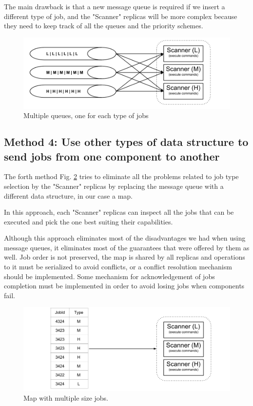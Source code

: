 The main drawback is that a new message queue is required if we insert a different type of job, and the "Scanner" replicas will be more complex because they need to keep track of all the queues and the priority schemes.

\begin{figure}[ht]
\centering
\includegraphics[width=\linewidth]{./img/3_MultipleQueueLoadBalancing.png}
\caption{Multiple queues, one for each type of jobs}
\label{fig:multipleQueueDistributionOfTasks}
\end{figure}

\subsection{Method 4: Use other types of data structure to send jobs from one component to another}
\label{subsection:method4}

The forth method Fig. \ref{fig:mapDistributionOfTasks} tries to eliminate all the problems related to job type selection by the "Scanner" replicas by replacing the message queue with a different data structure, in our case a map. 

In this approach, each "Scanner" replicas can inspect all the jobs that can be executed and pick the one best suiting their capabilities.

Although this approach eliminates most of the disadvantages we had when using message queues, it eliminates most of the guarantees that were offered by them as well. Job order is not preserved, the map is shared by all replicas and operations to it must be serialized to avoid conflicts, or a conflict resolution mechanism should be implemented. Some mechanism for acknowledgement of jobs completion must be implemented in order to avoid losing jobs when components fail.

\begin{figure}[ht]
\centering
\includegraphics[width=\linewidth]{./img/4_MapOrOtherDataStructureLoadBalancing.png}
\caption{Map with multiple size jobs.}
\label{fig:mapDistributionOfTasks}
\end{figure}

